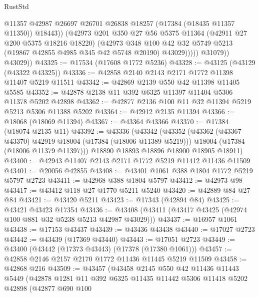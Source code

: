 \begin{lexlean}{RustStd}
\begin{coremodule}
                      @11357
                      @42987
                      @26697
                      @26701
                      @26838
                      @18257
                      (@17384 (@18435 @11357 @11350))
                      @18443))
                  (@42973
                    @201
                    @350
                    @27
                    @56
                    @5375
                    @11364
                    (@42911 @27 @200 @5375 @18216 @18220)
                    (@42973
                      @348
                      @100
                      @42
                      @32
                      @5749
                      @5213
                      (@19867 @42855 @4985 @345 @42 @5748 @20190)
                      @43029)))))
            @31079))
        @43029))
@43325 := @17534 (@17608 @1772 @5236)
@43328 := @43125 (@43129 (@43322 @43325))
@43336 := @42858 @2140 @2143 @2171 @1772 @11398 @11407 @5219 @11511
@43342 := @42869 @2139 @550 @42 @11398 @11405 @5585
@43352 := @42878 @2138 @11 @392 @6325 @11397 @11404 @5306 @11378 @5202 @42898
@43362 := @42877 @2136 @100 @11 @32 @11394 @5219 @5213 @5306 @11388 @5202
@43364 := @42912 @2135 @11394
@43366 := @18068 (@18069 @11394)
@43367 := @43364 @43366
@43370 := @17384 (@18074 @2135 @11)
@43392 := @43336
    (@43342
      (@43352
        (@43362 (@43367 @43370) @42919 @18004 (@17384 (@18006 @11389 @5219)))
        @18004
        (@17384 (@18006 @11379 @11397)))
      @18890
      @18893
      @18896
      @18900
      @18905
      @18911)
@43400 := @42943 @11407 @2143 @2171 @1772 @5219 @11412 @11436 @11509
@43401 := @20056 @42855
@43408 := @43401 @1061 @388 @1804 @1772 @5219 @5797 @2723
@43411 := @42968 @388 @1804 @5797
@43412 := @42973 @98
@43417 := @43412 @118 @27 @1770 @5211 @5240
@43420 := @42889 @84 @27 @84
@43421 := @43420 @5211
@43423 := @17343 (@42894 @84)
@43425 := @43421 @43423 @17354
@43436 := @43408 (@43411 (@43417 @43425 (@42974 @100 @881 @32 @5238 @5213 @42987 @43029)))
@43437 := @16957 @1061
@43438 := @17153 @43437
@43439 := @43436 @43438
@43440 := @17027 @2723
@43442 := @43439 (@17369 @43440)
@43443 := @17051 @2723
@43449 := @43400 (@43442 (@17373 @43443) (@17378 (@17380 @1061)))
@43457 := @42858 @2146 @2157 @2170 @1772 @11436 @11445 @5219 @11509
@43458 := @42868 @216
@43509 := @43457
    (@43458
      @2145
      @550
      @42
      @11436
      @11443
      @5449
      (@42878
        @1281
        @11
        @392
        @6325
        @11435
        @11442
        @5306
        @11418
        @5202
        @42898
        (@42877
          @690
          @100

\end{coremodule}
\end{lexlean}

